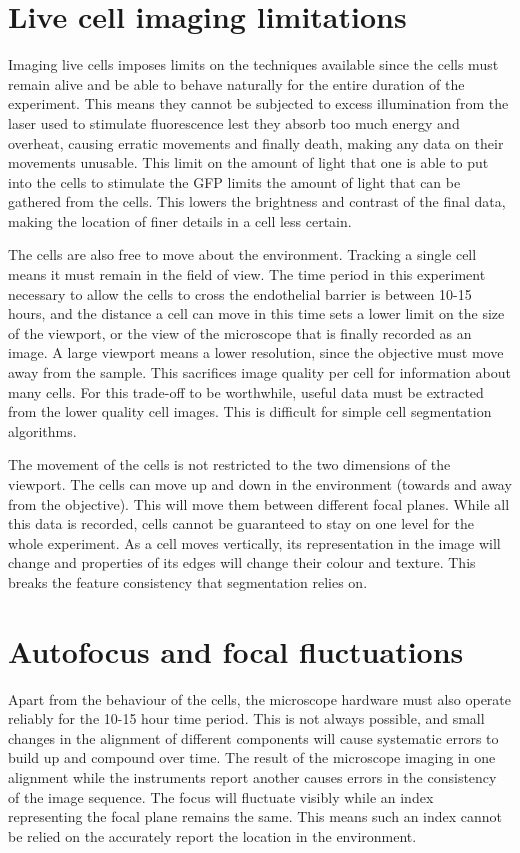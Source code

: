 \section{Live cell imaging limitations}

Imaging live cells imposes limits on the techniques available since the cells must remain alive and be able to behave naturally for the entire duration of the experiment. This means they cannot be subjected to excess illumination from the laser used to stimulate fluorescence lest they absorb too much energy and overheat, causing erratic movements and finally death, making any data on their movements unusable. This limit on the amount of light that one is able to put into the cells to stimulate the GFP limits the amount of light that can be gathered from the cells. This lowers the brightness and contrast of the final data, making the location of finer details in a cell less certain.

The cells are also free to move about the environment. Tracking a single cell means it must remain in the field of view. The time period in this experiment necessary to allow the cells to cross the endothelial barrier is between 10-15 hours, and the distance a cell can move in this time sets a lower limit on the size of the viewport, or the view of the microscope that is finally recorded as an image. A large viewport means a lower resolution, since the objective must move away from the sample. This sacrifices image quality per cell for information about many cells. For this trade-off to be worthwhile, useful data must be extracted from the lower quality cell images. This is difficult for simple cell segmentation algorithms.

The movement of the cells is not restricted to the two dimensions of the viewport. The cells can move up and down in the environment (towards and away from the objective). This will move them between different focal planes. While all this data is recorded, cells cannot be guaranteed to stay on one level for the whole experiment. As a cell moves vertically, its representation in the image will change and properties of its edges will change their colour and texture. This breaks the feature consistency that segmentation relies on.

\section{Autofocus and focal fluctuations}

Apart from the behaviour of the cells, the microscope hardware must also operate reliably for the 10-15 hour time period. This is not always possible, and small changes in the alignment of different components will cause systematic errors to build up and compound over time. The result of the microscope imaging in one alignment while the instruments report another causes errors in the consistency of the image sequence. The focus will fluctuate visibly while an index representing the focal plane remains the same. This means such an index cannot be relied on the accurately report the location in the environment.

